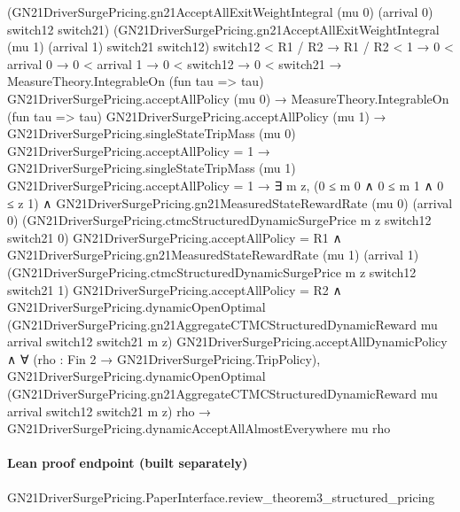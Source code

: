 \documentclass[10pt]{article}
\begin{document}
\begin{ReviewVerbatim}
            (GN21DriverSurgePricing.gn21AcceptAllExitWeightIntegral (mu 0) (arrival 0) switch12 switch21)
            (GN21DriverSurgePricing.gn21AcceptAllExitWeightIntegral (mu 1) (arrival 1) switch21 switch12) switch12 <
          R1 / R2 →
        R1 / R2 < 1 →
          0 < arrival 0 →
            0 < arrival 1 →
              0 < switch12 →
                0 < switch21 →
                  MeasureTheory.IntegrableOn (fun tau => tau) GN21DriverSurgePricing.acceptAllPolicy (mu 0) →
                    MeasureTheory.IntegrableOn (fun tau => tau) GN21DriverSurgePricing.acceptAllPolicy (mu 1) →
                      GN21DriverSurgePricing.singleStateTripMass (mu 0) GN21DriverSurgePricing.acceptAllPolicy = 1 →
                        GN21DriverSurgePricing.singleStateTripMass (mu 1) GN21DriverSurgePricing.acceptAllPolicy = 1 →
                          ∃ m z,
                            (0 ≤ m 0 ∧ 0 ≤ m 1 ∧ 0 ≤ z 1) ∧
                              GN21DriverSurgePricing.gn21MeasuredStateRewardRate (mu 0) (arrival 0)
                                    (GN21DriverSurgePricing.ctmcStructuredDynamicSurgePrice m z switch12 switch21 0)
                                    GN21DriverSurgePricing.acceptAllPolicy =
                                  R1 ∧
                                GN21DriverSurgePricing.gn21MeasuredStateRewardRate (mu 1) (arrival 1)
                                      (GN21DriverSurgePricing.ctmcStructuredDynamicSurgePrice m z switch12 switch21 1)
                                      GN21DriverSurgePricing.acceptAllPolicy =
                                    R2 ∧
                                  GN21DriverSurgePricing.dynamicOpenOptimal
                                      (GN21DriverSurgePricing.gn21AggregateCTMCStructuredDynamicReward mu arrival
                                        switch12 switch21 m z)
                                      GN21DriverSurgePricing.acceptAllDynamicPolicy ∧
                                    ∀ (rho : Fin 2 → GN21DriverSurgePricing.TripPolicy),
                                      GN21DriverSurgePricing.dynamicOpenOptimal
                                          (GN21DriverSurgePricing.gn21AggregateCTMCStructuredDynamicReward mu arrival
                                            switch12 switch21 m z)
                                          rho →
                                        GN21DriverSurgePricing.dynamicAcceptAllAlmostEverywhere mu rho
\end{ReviewVerbatim}

\paragraph{Lean proof endpoint (built separately)}\begin{ReviewVerbatim}
GN21DriverSurgePricing.PaperInterface.review_theorem3_structured_pricing
\end{ReviewVerbatim}
\end{document}
